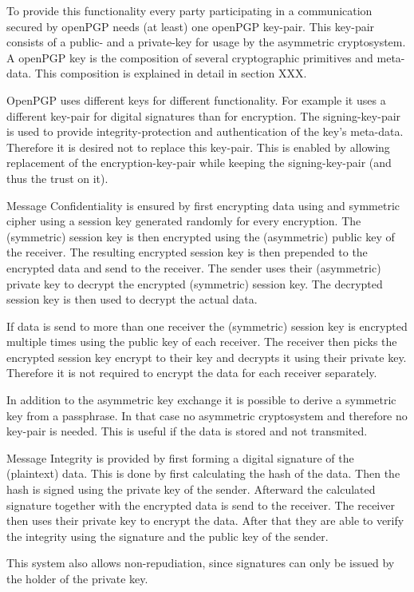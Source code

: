 To provide this functionality every party participating in a communication secured by openPGP needs (at least) one openPGP key-pair. This key-pair consists of a public- and a private-key for usage by the asymmetric cryptosystem. A openPGP key is the composition of several cryptographic primitives and meta-data. This composition is explained in detail in section XXX. 


OpenPGP uses different keys for different functionality. For example it uses a different key-pair for digital signatures than for encryption. The signing-key-pair is used to provide integrity-protection and authentication of the key's meta-data. Therefore it is desired not to replace this key-pair. This is enabled by allowing replacement of the encryption-key-pair while keeping the signing-key-pair (and thus the trust on it).


Message Confidentiality is ensured by first encrypting data using and symmetric cipher using a session key generated randomly for every encryption. The (symmetric) session key is then encrypted using the (asymmetric) public key of the receiver. The resulting encrypted session key is then prepended to the encrypted data and send to the receiver. The sender uses their (asymmetric) private key to decrypt the encrypted (symmetric) session key. The decrypted session key is then used to decrypt the actual data.

If data is send to more than one receiver the (symmetric) session key is encrypted  multiple times using the public key of each receiver. The receiver then picks the encrypted session key encrypt to their key and decrypts it using their private key. Therefore it is not required to encrypt the data for each receiver separately.

In addition to the asymmetric key exchange it is possible to derive a symmetric key from a passphrase. In that case no asymmetric cryptosystem and therefore no key-pair is needed. This is useful if the data is stored and not transmited.

Message Integrity is provided by first forming a digital signature of the (plaintext) data. This is done by first calculating the hash of the data. Then the hash is signed using the private key of the sender. Afterward the calculated signature together with the encrypted data is send to the receiver. The receiver then uses their private key to encrypt the data. After that they are able to verify the integrity using the signature and the public key of the sender.

This system also allows non-repudiation, since signatures can only be issued by the holder of the private key.


